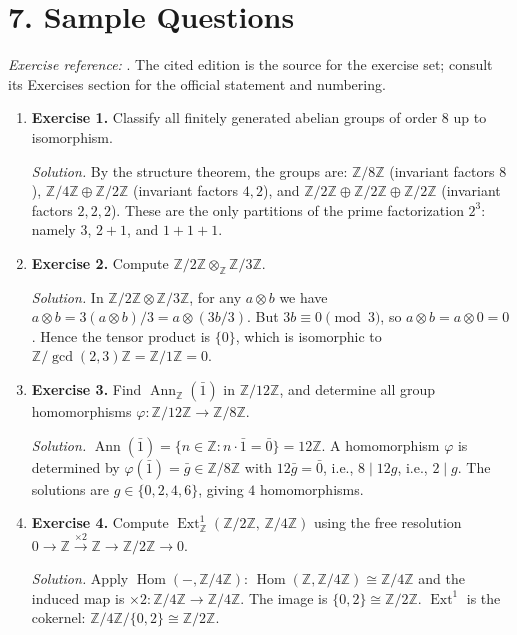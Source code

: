 \section*{7. Sample Questions}
\emph{Exercise reference:} \cite{module_theory_ref1}. The cited edition is the source for the exercise set; consult its Exercises section for the official statement and numbering.
\begin{enumerate}[leftmargin=*,itemsep=0.9em]
\item \textbf{Exercise 1.} Classify all finitely generated abelian groups of order $8$ up to isomorphism.

\emph{Solution.} By the structure theorem, the groups are: $\mathbb{Z}/8\mathbb{Z}$ (invariant factors $8$), $\mathbb{Z}/4\mathbb{Z}\oplus\mathbb{Z}/2\mathbb{Z}$ (invariant factors $4,2$), and $\mathbb{Z}/2\mathbb{Z}\oplus\mathbb{Z}/2\mathbb{Z}\oplus\mathbb{Z}/2\mathbb{Z}$ (invariant factors $2,2,2$). These are the only partitions of the prime factorization $2^3$: namely $3$, $2+1$, and $1+1+1$.

\item \textbf{Exercise 2.} Compute $\mathbb{Z}/2\mathbb{Z}\otimes_{\mathbb{Z}}\mathbb{Z}/3\mathbb{Z}$.

\emph{Solution.} In $\mathbb{Z}/2\mathbb{Z}\otimes\mathbb{Z}/3\mathbb{Z}$, for any $a\otimes b$ we have $a\otimes b=3(a\otimes b)/3=a\otimes(3b/3)$. But $3b\equiv 0\pmod{3}$, so $a\otimes b=a\otimes 0=0$. Hence the tensor product is $\{0\}$, which is isomorphic to $\mathbb{Z}/\gcd(2,3)\mathbb{Z}=\mathbb{Z}/1\mathbb{Z}=0$.

\item \textbf{Exercise 3.} Find $\operatorname{Ann}_{\mathbb{Z}}(\bar{1})$ in $\mathbb{Z}/12\mathbb{Z}$, and determine all group homomorphisms $\varphi\colon\mathbb{Z}/12\mathbb{Z}\to\mathbb{Z}/8\mathbb{Z}$.

\emph{Solution.} $\operatorname{Ann}(\bar{1})=\{n\in\mathbb{Z}:n\cdot\bar{1}=\bar{0}\}=12\mathbb{Z}$. A homomorphism $\varphi$ is determined by $\varphi(\bar{1})=\bar{g}\in\mathbb{Z}/8\mathbb{Z}$ with $12\bar{g}=\bar{0}$, i.e., $8\mid 12g$, i.e., $2\mid g$. The solutions are $g\in\{0,2,4,6\}$, giving $4$ homomorphisms.

\item \textbf{Exercise 4.} Compute $\operatorname{Ext}^1_{\mathbb{Z}}(\mathbb{Z}/2\mathbb{Z},\,\mathbb{Z}/4\mathbb{Z})$ using the free resolution $0\to\mathbb{Z}\xrightarrow{\times 2}\mathbb{Z}\to\mathbb{Z}/2\mathbb{Z}\to 0$.

\emph{Solution.} Apply $\operatorname{Hom}(-,\mathbb{Z}/4\mathbb{Z})$: $\operatorname{Hom}(\mathbb{Z},\mathbb{Z}/4\mathbb{Z})\cong\mathbb{Z}/4\mathbb{Z}$ and the induced map is $\times 2\colon\mathbb{Z}/4\mathbb{Z}\to\mathbb{Z}/4\mathbb{Z}$. The image is $\{0,2\}\cong\mathbb{Z}/2\mathbb{Z}$. $\operatorname{Ext}^1$ is the cokernel: $\mathbb{Z}/4\mathbb{Z}/\{0,2\}\cong\mathbb{Z}/2\mathbb{Z}$.


\end{enumerate}
